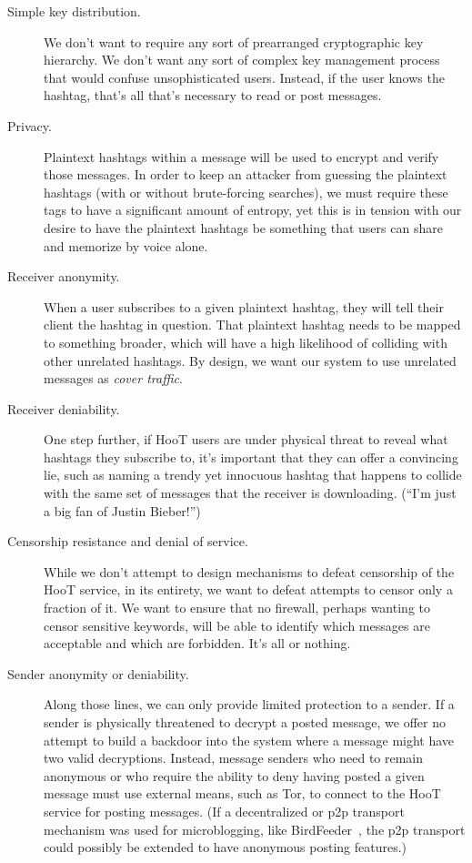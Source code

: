 \begin{description}
\begin{description}
\item[Simple key distribution.] We don't want to require any sort of prearranged cryptographic key hierarchy. We don't want any sort of complex key management process that would confuse unsophisticated users.  Instead, if the user knows the hashtag, that's all that's necessary to read or post messages.

\item[Privacy.] Plaintext hashtags within a message will be used to encrypt and verify those messages.  In order to keep an attacker from guessing the plaintext hashtags (with or without brute-forcing searches), we must require these tags to have a significant amount of entropy, yet this is in tension with our desire to have the plaintext hashtags be something that users can share and memorize by voice alone.

\item[Receiver anonymity.]  When a user subscribes to a given plaintext hashtag, they will tell their client the hashtag in question. That plaintext hashtag needs to be mapped to something broader, which will have a high likelihood of colliding with other unrelated hashtags. By design, we want our system to use unrelated messages as {\em cover traffic}.

\item[Receiver deniability.] One step further, if HooT users are under physical threat to reveal what hashtags they subscribe to, it's important that they can offer a convincing lie, such as naming a trendy yet innocuous hashtag that happens to collide with the same set of messages that the receiver is downloading. (``I'm just a big fan of Justin Bieber!'')

\item[Censorship resistance and denial of service.] While we don't attempt to design mechanisms to defeat censorship of the HooT service, in its entirety, we want to defeat attempts to censor only a fraction of it. We want to ensure that no firewall, perhaps wanting to censor sensitive keywords, will be able to identify which messages are acceptable and which are forbidden. It's all or nothing. %

\item[Sender anonymity or deniability.] Along those lines, we can only provide limited protection to a sender. If a sender is physically threatened to decrypt a posted message, we offer no attempt to build a backdoor into the system where a message might have two valid decryptions. Instead, message senders who need to remain anonymous or who require the ability to deny having posted a given message must use external means, such as Tor, to connect to the HooT service for posting messages. (If a decentralized or p2p transport mechanism was used for microblogging, like BirdFeeder~\cite{sandler09}, the p2p transport could possibly be extended to have anonymous posting features.)


\end{description}
\end{description}
